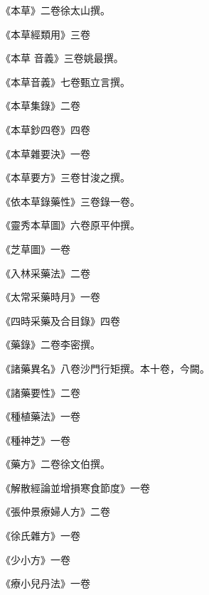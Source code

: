 \begin{pinyinscope}
 《本草》二卷徐太山撰。



 《本草經類用》三卷



 《本草
 音義》三卷姚最撰。



 《本草音義》七卷甄立言撰。



 《本草集錄》二卷



 《本草鈔四卷》四卷



 《本草雜要決》一卷



 《本草要方》三卷甘浚之撰。



 《依本草錄藥性》三卷錄一卷。



 《靈秀本草圖》六卷原平仲撰。



 《芝草圖》一卷



 《入林采藥法》二卷



 《太常采藥時月》一卷



 《四時采藥及合目錄》四卷



 《藥錄》二卷李密撰。



 《諸藥異名》八卷沙門行矩撰。本十卷，今闕。



 《諸藥要性》二卷



 《種植藥法》一卷



 《種神芝》一卷



 《藥方》二卷徐文伯撰。



 《解散經論並增損寒食節度》一卷



 《張仲景療婦人方》二卷



 《徐氏雜方》一卷



 《少小方》一卷



 《療小兒丹法》一卷




\end{pinyinscope}
